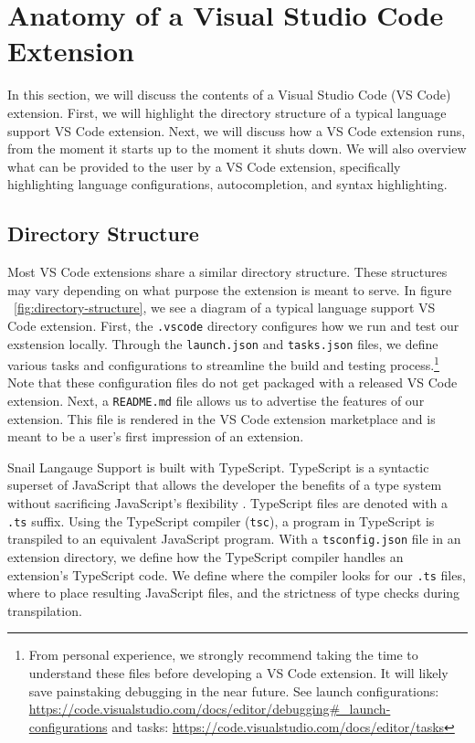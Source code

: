 \documentclass{article}
\begin{document}
\section{Anatomy of a Visual Studio Code Extension}

In this section, we will discuss the contents of a Visual Studio Code (VS Code) extension. First, we will highlight the directory structure of a typical language support VS Code extension. Next, we will discuss how a VS Code extension runs, from the moment it starts up to the moment it shuts down. We will also overview what can be provided to the user by a VS Code extension, specifically highlighting language configurations, autocompletion, and syntax highlighting. 

\subsection{Directory Structure}

Most VS Code extensions share a similar directory structure. These structures may vary depending on what purpose the extension is meant to serve. In figure ~\ref{fig:directory-structure}, we see a diagram of a typical language support VS Code extension. First, the \lstinline{.vscode} directory configures how we run and test our exstension locally. Through the \lstinline{launch.json} and \lstinline{tasks.json} files, we define various tasks and configurations to streamline the build and testing process.\footnote{From personal experience, we strongly recommend taking the time to understand these files before developing a VS Code extension. It will likely save painstaking debugging in the near future. See launch configurations: \url{https://code.visualstudio.com/docs/editor/debugging\#_launch-configurations} and tasks: \url{https://code.visualstudio.com/docs/editor/tasks}} Note that these configuration files do not get packaged with a released VS Code extension. Next, a \lstinline{README.md} file allows us to advertise the features of our extension. This file is rendered in the VS Code extension marketplace and is meant to be a user's first impression of an extension.

Snail Langauge Support is built with TypeScript. TypeScript is a syntactic superset of JavaScript that allows the developer the benefits of a type system without sacrificing JavaScript's flexibility \cite{TypeScript_2023}. TypeScript files are denoted with a \lstinline{.ts} suffix. Using the TypeScript compiler (\lstinline{tsc}), a program in TypeScript is transpiled to an equivalent JavaScript program. With a \lstinline{tsconfig.json} file in an extension directory, we define how the TypeScript compiler handles an extension's TypeScript code. We define where the compiler looks for our \lstinline{.ts} files, where to place resulting JavaScript files, and the strictness of type checks during transpilation.
\end{document}
